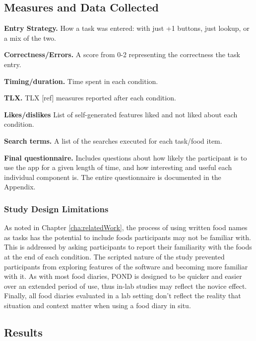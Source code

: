 \subsection{Measures and Data Collected}
\begin{enumerate*}
\item \textbf{Entry Strategy.} How a task was entered: with just +1 buttons, just lookup, or a mix of the two. 
\item \textbf{Correctness/Errors. } A score from 0-2 representing the correctness the task entry. 
\item \textbf{Timing/duration.} Time spent in each condition. 
\item \textbf{TLX.} TLX [ref] measures reported after each condition. 
\item \textbf{Likes/dislikes} List of self-generated features liked and not liked about each condition. 
\item \textbf{Search terms.} A list of the searches executed for each task/food item. 
\item \textbf{Final questionnaire.} Includes questions about how likely the participant is to use the app for a given length of time, and how interesting and useful each individual component is. The entire questionnaire is documented in the Appendix. 
\end{enumerate*}


\subsubsection{Study Design Limitations}
As noted in Chapter \ref{cha:relatedWork}, the process of using written food names as tasks has the potential to include foods participants may not be familiar with. This is addressed by asking participants to report their familiarity with the foods at the end of each condition. The scripted nature of the study prevented participants from exploring features of the software and becoming more familiar with it. As with most food diaries, POND is designed to be quicker and easier over an extended period of use, thus in-lab studies may reflect the novice effect. Finally, all food diaries evaluated in a lab setting don't reflect the reality that  situation and context matter when using a food diary in situ. 

\subsection{Results}

